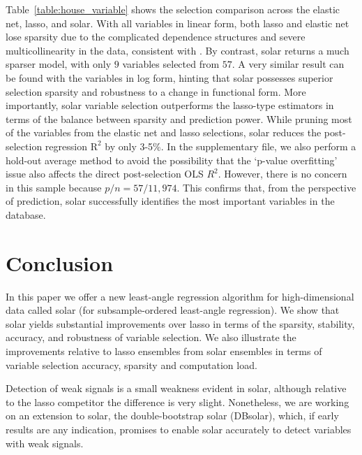 \documentclass[12pt]{article}
\begin{document}
Table~\ref{table:house_variable} shows the selection comparison across the elastic net, lasso, and solar. With all variables in linear form, both lasso and elastic net lose sparsity due to the complicated dependence structures and severe multicollinearity in the data, consistent with \citet{jia2010model}. By contrast, solar returns a much sparser model, with only $9$ variables selected from $57$. A very similar result can be found with the variables in log form, hinting that solar possesses superior selection sparsity and robustness to a change in functional form. More importantly, solar variable selection outperforms the lasso-type estimators in terms of the balance between sparsity and prediction power. While pruning most of the variables from the elastic net and lasso selections, solar reduces the post-selection regression $\mathrm{R}^2$ by only 3-5\%. In the supplementary file, we also perform a hold-out average method to avoid the possibility that the `p-value overfitting' issue also affects the direct post-selection OLS $R^2$. However, there is no concern in this sample because $p/n=57/11,974$. This confirms that, from the perspective of prediction, solar successfully identifies the most important variables in the database.


\section{Conclusion}

In this paper we offer a new least-angle regression algorithm for high-dimensional data called solar (for subsample-ordered least-angle regression). We show that solar yields substantial improvements over lasso in terms of the sparsity, stability, accuracy, and robustness of variable selection. We also illustrate the improvements relative to lasso ensembles from solar ensembles in terms of variable selection accuracy, sparsity and computation load.

Detection of weak signals is a small weakness evident in solar, although relative to the lasso competitor the difference is very slight. Nonetheless, we are working on an extension to solar, the double-bootstrap solar (DBsolar), which, if early results are any indication, promises to enable solar accurately to detect variables with weak signals.

\end{document}
